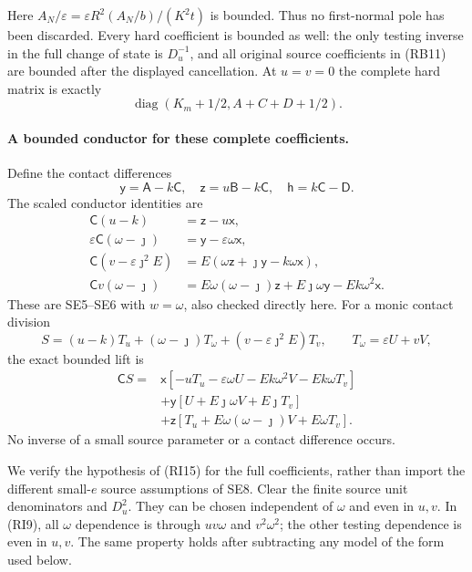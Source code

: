 Here $A_N/\varepsilon=
\varepsilon R^2(A_N/b)/(K^2t)$ is bounded. Thus no first-normal
pole has been discarded. Every hard coefficient is bounded as well:
the only testing inverse in the full change of state is $D_u^{-1}$,
and all original source coefficients in (RB11) are bounded after the
displayed cancellation. At $u=v=0$ the complete hard matrix is exactly
\[
 \operatorname{diag}(K_m+1/2,A+C+D+1/2).             \tag{RI13}
\]

\paragraph{A bounded conductor for these complete coefficients.}
Define the contact differences
\[
 \mathsf y=\mathsf A-k\mathsf C,\quad
 \mathsf z=u\mathsf B-k\mathsf C,\quad
 \mathsf h=k\mathsf C-\mathsf D.
\]
The scaled conductor identities are
\[
\begin{aligned}
 \mathsf C(u-k)&=\mathsf z-u\mathsf x,\\
 \varepsilon\mathsf C(\omega-\jmath)
       &=\mathsf y-\varepsilon\omega\mathsf x,\\
 \mathsf C(v-\varepsilon\jmath^2E)
       &=E(\omega\mathsf z+\jmath\mathsf y-k\omega\mathsf x),\\
 \mathsf Cv(\omega-\jmath)
       &=E\omega(\omega-\jmath)\mathsf z+
         E\jmath\omega\mathsf y-Ek\omega^2\mathsf x.
\end{aligned}                                                       \tag{RI14}
\]
These are SE5--SE6 with $w=\omega$, also checked directly here.
For a monic contact division
\[
 S=(u-k)T_u+(\omega-\jmath)T_\omega+
           (v-\varepsilon\jmath^2E)T_v,
 \qquad T_\omega=\varepsilon U+vV,
\]
the exact bounded lift is
\[
\begin{aligned}
 \mathsf CS={}&\mathsf x[-uT_u-\varepsilon\omega U
                    -Ek\omega^2V-Ek\omega T_v]\\
 &+\mathsf y[U+E\jmath\omega V+E\jmath T_v]\\
 &+\mathsf z[T_u+E\omega(\omega-\jmath)V+E\omega T_v].
\end{aligned}                                                       \tag{RI15}
\]
No inverse of a small source parameter or a contact difference occurs.

We verify the hypothesis of (RI15) for the full coefficients, rather
than import the different small-$e$ source assumptions of SE8.
Clear the finite source unit denominators and $D_u^2$. They can be
chosen independent of $\omega$ and even in $u,v$. In (RI9), all
$\omega$ dependence is through $uv\omega$ and $v^2\omega^2$;
the other testing dependence is even in $u,v$. The same property
holds after subtracting any model of the form used below.

